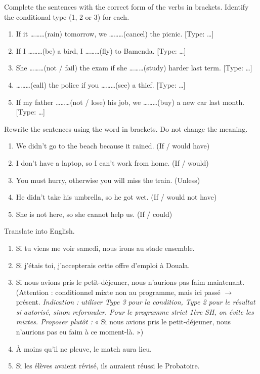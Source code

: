 \documentclass[11pt]{article}
\begin{document}
\begin{exercice}
Complete the sentences with the correct form of the verbs in brackets. Identify the conditional type (1, 2 or 3) for each.
\begin{enumerate}
\item If it \ldots\ldots\ldots (rain) tomorrow, we \ldots\ldots\ldots (cancel) the picnic. [Type: \ldots]
\item If I \ldots\ldots\ldots (be) a bird, I \ldots\ldots\ldots (fly) to Bamenda. [Type: \ldots]
\item She \ldots\ldots\ldots (not / fail) the exam if she \ldots\ldots\ldots (study) harder last term. [Type: \ldots]
\item \ldots\ldots\ldots (call) the police if you \ldots\ldots\ldots (see) a thief. [Type: \ldots]
\item If my father \ldots\ldots\ldots (not / lose) his job, we \ldots\ldots\ldots (buy) a new car last month. [Type: \ldots]
\end{enumerate}
\end{exercice}

\begin{exercice}
Rewrite the sentences using the word in brackets. Do not change the meaning.
\begin{enumerate}
\item We didn't go to the beach because it rained. (If / would have)
\item I don't have a laptop, so I can't work from home. (If / would)
\item You must hurry, otherwise you will miss the train. (Unless)
\item He didn't take his umbrella, so he got wet. (If / would not have)
\item She is not here, so she cannot help us. (If / could)
\end{enumerate}
\end{exercice}

\begin{exercice}
Translate into English.
\begin{enumerate}
\item Si tu viens me voir samedi, nous irons au stade ensemble.
\item Si j'étais toi, j'accepterais cette offre d'emploi à Douala.
\item Si nous avions pris le petit-déjeuner, nous n'aurions pas faim maintenant. (Attention : conditionnel mixte non au programme, mais ici passé $\rightarrow$ présent. \textit{Indication : utiliser Type 3 pour la condition, Type 2 pour le résultat si autorisé, sinon reformuler. Pour le programme strict 1ère SH, on évite les mixtes. Proposer plutôt :} « Si nous avions pris le petit-déjeuner, nous n'aurions pas eu faim à ce moment-là. »)
\item À moins qu'il ne pleuve, le match aura lieu.
\item Si les élèves avaient révisé, ils auraient réussi le Probatoire.
\end{enumerate}
\end{exercice}
\end{document}
